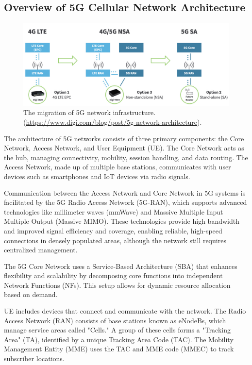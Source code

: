\documentclass[sigplan,screen]{acmart}
\begin{document}
\subsection{Overview of 5G Cellular Network Architecture}

\begin{figure}[htbp]
\centering
\includegraphics[width=\linewidth]{5gMigration.jpg}
\caption{The migration of 5G network infrastructure. (\url{https://www.digi.com/blog/post/5g-network-architecture}).}
\end{figure}

The architecture of 5G networks consists of three primary components: the Core Network, Access Network, and User Equipment (UE). The Core Network acts as the hub, managing connectivity, mobility, session handling, and data routing. The Access Network, made up of multiple base stations, communicates with user devices such as smartphones and IoT devices via radio signals.

Communication between the Access Network and Core Network in 5G systems is facilitated by the 5G Radio Access Network (5G-RAN), which supports advanced technologies like millimeter waves (mmWave) and Massive Multiple Input Multiple Output (Massive MIMO). These technologies provide high bandwidth and improved signal efficiency and coverage, enabling reliable, high-speed connections in densely populated areas, although the network still requires centralized management.

The 5G Core Network uses a Service-Based Architecture (SBA) that enhances flexibility and scalability by decomposing core functions into independent Network Functions (NFs). This setup allows for dynamic resource allocation based on demand.

UE includes devices that connect and communicate with the network. The Radio Access Network (RAN) consists of base stations known as eNodeBs, which manage service areas called "Cells." A group of these cells forms a "Tracking Area" (TA), identified by a unique Tracking Area Code (TAC). The Mobility Management Entity (MME) uses the TAC and MME code (MMEC) to track subscriber locations. \cite{hong2018guti}
\end{document}
